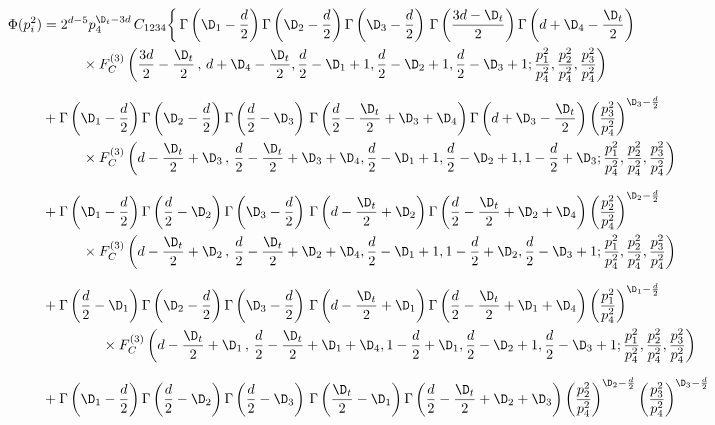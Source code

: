 \documentclass[a4paper,11pt,openright,twoside]{book}
\numberwithin{equation}{section}
\begin{document}
{{	\begin{align}
		\Phi(p_i^2)&=2^{d-5}p_4^{\D_t-3d}\, C_{1234}\bigg\{\,\Gamma\left(\D_1-\frac{d}{2}\right)\Gamma\left(\D_2-\frac{d}{2}\right)\Gamma\left(\D_3-\frac{d}{2}\right)\,\Gamma\left(\frac{3d-\D_t}{2}\right)\Gamma\left(d+\D_4-\frac{\D_t}{2}\right)\notag\\
		&\hspace{1cm}\times F_C^{(3)}\left(\frac{3d}{2}-\frac{\D_t}{2}\,,\,d+\D_4-\frac{\D_t}{2},\frac{d}{2}-\D_1+1,\frac{d}{2}-\D_2+1,\frac{d}{2}-\D_3+1;\frac{p_1^2}{p_4^2},\frac{p_2^2}{p_4^2},\frac{p_3^2}{p_4^2}\right)\notag\\[1.5ex]
		&+\Gamma\left(\D_1-\frac{d}{2}\right)\Gamma\left(\D_2-\frac{d}{2}\right)\Gamma\left(\frac{d}{2}-\D_3\right)\,\Gamma\left(\frac{d}{2}-\frac{\D_t}{2}+\D_3+\D_4\right)\Gamma\left(d+\D_3-\frac{\D_t}{2}\right)\left(\frac{p_3^2}{p_4^2}\right)^{\D_3-\frac{d}{2}}\notag\\
		&\hspace{1cm}\times F_C^{(3)}\left(d-\frac{\D_t}{2}+\D_3\,,\,\frac{d}{2}-\frac{\D_t}{2}+\D_3+\D_4,\frac{d}{2}-\D_1+1,\frac{d}{2}-\D_2+1,1-\frac{d}{2}+\D_3;\frac{p_1^2}{p_4^2},\frac{p_2^2}{p_4^2},\frac{p_3^2}{p_4^2}\right)\notag\\[1.5ex]
		&+\Gamma\left(\D_1-\frac{d}{2}\right)\Gamma\left(\frac{d}{2}-\D_2\right)\Gamma\left(\D_3-\frac{d}{2}\right)\,\Gamma\left(d-\frac{\D_t}{2}+\D_2\right)\Gamma\left(\frac{d}{2}-\frac{\D_t}{2}+\D_2+\D_4\right)\left(\frac{p_2^2}{p_4^2}\right)^{\D_2-\frac{d}{2}}\notag\\
		&\hspace{1cm}\times F_C^{(3)}\left(d-\frac{\D_t}{2}+\D_2\,,\,\frac{d}{2}-\frac{\D_t}{2}+\D_2+\D_4,\frac{d}{2}-\D_1+1,1-\frac{d}{2}+\D_2,\frac{d}{2}-\D_3+1;\frac{p_1^2}{p_4^2},\frac{p_2^2}{p_4^2},\frac{p_3^2}{p_4^2}\right)\notag\\[1.5ex]
		&+\Gamma\left(\frac{d}{2}-\D_1\right)\Gamma\left(\D_2-\frac{d}{2}\right)\Gamma\left(\D_3-\frac{d}{2}\right)\,\Gamma\left(d-\frac{\D_t}{2}+\D_1\right)\Gamma\left(\frac{d}{2}-\frac{\D_t}{2}+\D_1+\D_4\right)\left(\frac{p_1^2}{p_4^2}\right)^{\D_1-\frac{d}{2}}\notag\\
		&\hspace{1.5cm}\times F_C^{(3)}\left(d-\frac{\D_t}{2}+\D_1\,,\,\frac{d}{2}-\frac{\D_t}{2}+\D_1+\D_4,1-\frac{d}{2}+\D_1,\frac{d}{2}-\D_2+1,\frac{d}{2}-\D_3+1;\frac{p_1^2}{p_4^2},\frac{p_2^2}{p_4^2},\frac{p_3^2}{p_4^2}\right)\notag\\[1.5ex]
		&+\Gamma\left(\D_1-\frac{d}{2}\right)\Gamma\left(\frac{d}{2}-\D_2\right)\Gamma\left(\frac{d}{2}-\D_3\right)\,\Gamma\left(\frac{\D_t}{2}-\D_1\right)\Gamma\left(\frac{d}{2}-\frac{\D_t}{2}+\D_2+\D_3\right)\left(\frac{p_2^2}{p_4^2}\right)^{\D_2-\frac{d}{2}}\left(\frac{p_3^2}{p_4^2}\right)^{\D_3-\frac{d}{2}}\notag\\

\end{align}}}
\end{document}
